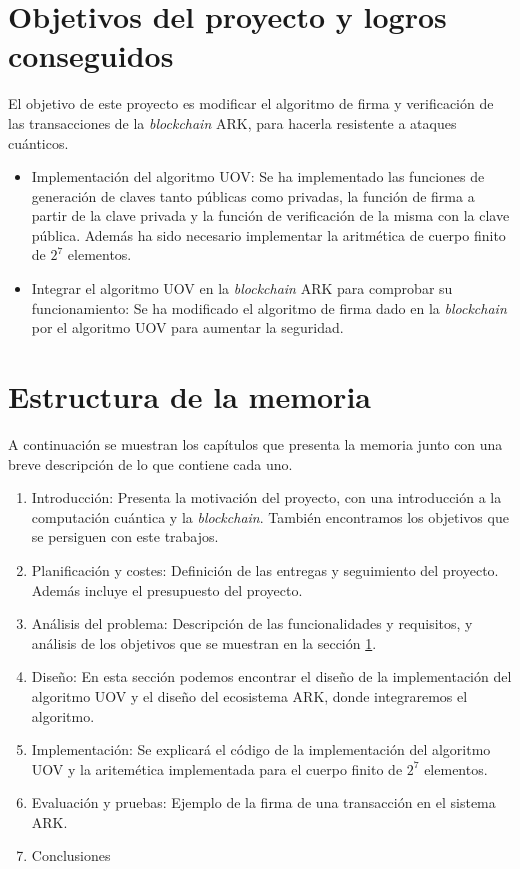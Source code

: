 \section{Objetivos del proyecto y logros conseguidos}
\label{sec:objetivos}
El objetivo de este proyecto es modificar el algoritmo de firma y verificación de las transacciones de la \textit{blockchain} ARK, para hacerla resistente a ataques cuánticos.

\begin{itemize}
	\item Implementación del algoritmo UOV: Se ha implementado las funciones de generación de claves tanto públicas como privadas, la función de firma a partir de la clave privada y la función de verificación de la misma con la clave pública. Además ha sido necesario implementar la aritmética de cuerpo finito de $2^7$ elementos.
	\item Integrar el algoritmo UOV en la \textit{blockchain} ARK para comprobar su funcionamiento: Se ha modificado el algoritmo de firma dado en la \textit{blockchain} por el algoritmo UOV para aumentar la seguridad.

\end{itemize}


\section{Estructura de la memoria}

A continuación se muestran los capítulos que presenta la memoria junto con una breve descripción de lo que contiene cada uno.

\begin{enumerate}
	\item Introducción: Presenta la motivación del proyecto, con una introducción a la computación cuántica y la \textit{blockchain}. También encontramos los objetivos que se persiguen con este trabajos.
	\item Planificación y costes: Definición de las entregas y seguimiento del proyecto. Además incluye el presupuesto del proyecto.
	\item Análisis del problema: Descripción de las funcionalidades y requisitos, y análisis de los objetivos que se muestran en la sección \ref{sec:objetivos}.
	\item Diseño: En esta sección podemos encontrar el diseño de la implementación del algoritmo UOV y el diseño del ecosistema ARK, donde integraremos el algoritmo.
	\item Implementación: Se explicará el código de la implementación del algoritmo UOV y la aritemética implementada para el cuerpo finito de $2^7$ elementos.
	\item Evaluación y pruebas: Ejemplo de la firma de una transacción en el sistema ARK.
	\item Conclusiones
\end{enumerate}

